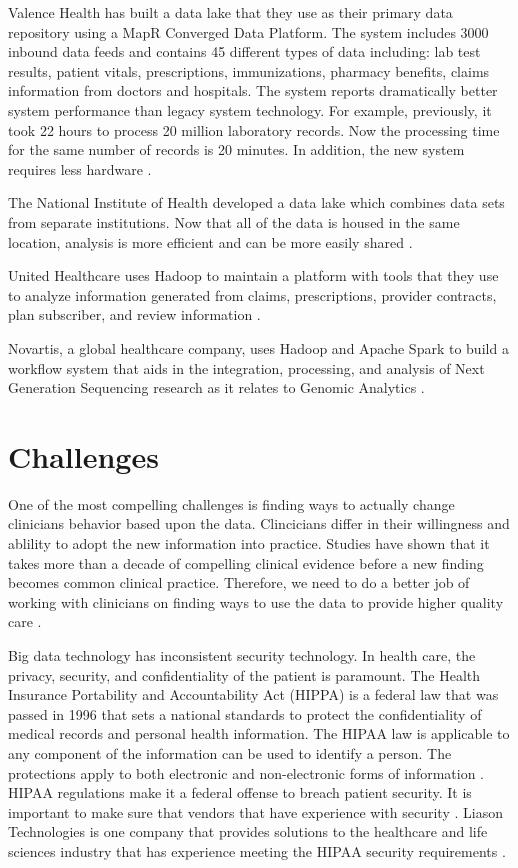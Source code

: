 \documentclass[sigconf]{acmart}
\begin{document}
Valence Health has built a data lake that they use as their primary data repository using a MapR Converged Data Platform. The system includes 3000 inbound data feeds and contains 45 different types of data including:  lab test results, patient vitals, prescriptions, immunizations, pharmacy benefits, claims information from doctors and hospitals. The system reports dramatically better system performance than legacy system technology. For example, previously, it took 22 hours to process 20 million laboratory records. Now the processing time for the same number of records is 20 minutes. In addition, the new system requires less hardware \cite{www-google-McDonald}. 

The National Institute of Health developed a data lake which combines data sets from separate institutions. Now that all of the data is housed in the same location, analysis is more efficient and can be more easily shared \cite{www-google-McDonald}.

United Healthcare uses Hadoop to maintain a platform with tools that they use to analyze information generated from claims, prescriptions, provider contracts, plan subscriber, and review information \cite{www-google-McDonald}.

Novartis, a global healthcare company, uses Hadoop and Apache Spark to build a workflow system that aids in the integration, processing, and analysis of Next Generation Sequencing research as it relates to Genomic Analytics \cite{www-google-McDonald}.


\section{Challenges}
One of the most compelling challenges is finding ways to actually change clinicians behavior based upon the data. Clincicians differ in their willingness and ablility to adopt the new information into practice.  Studies have shown that it takes more than a decade of compelling clinical evidence before a new finding becomes common clinical practice. Therefore, we need to do a better job of working with clinicians on finding ways to use the data to provide higher quality care \cite{www-google-hadoop}. 

Big data technology has inconsistent security technology. In health care, the privacy, security, and confidentiality of the patient is paramount.  The Health Insurance Portability and Accountability Act (HIPPA) is a federal law that was passed in 1996 that sets a national standards to protect the confidentiality of medical records and personal health information. The HIPAA law is applicable to any component of the information can be used to identify a person. The protections apply to both electronic and non-electronic forms of information \cite{HIPAA}. HIPAA regulations make it a federal offense to breach patient security. It is important to make sure that vendors that have experience with security \cite{www-google-HlthCat}. Liason Technologies is one company that provides solutions to the healthcare and life sciences industry that has experience meeting the HIPAA security requirements \cite{www-google-McDonald}.
 
\end{document}

